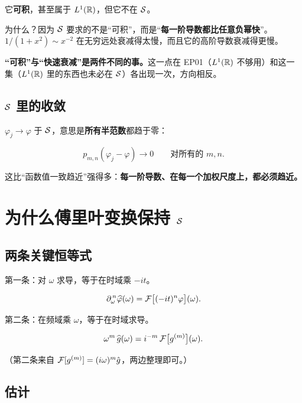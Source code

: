 \begin{warnbox}[$1/(1+x^{2})$ 是最有教育意义的一个反例]
它\textbf{可积}，甚至属于 $L^1(\mathbb{R})$，但它不在 $\mathcal{S}$。

为什么？因为 $\mathcal{S}$ 要求的不是“可积”，而是“\textbf{每一阶导数都比任意负幂快}”。$1/(1+x^{2})\sim x^{-2}$ 在无穷远处衰减得太慢，而且它的高阶导数衰减得更慢。

\textbf{“可积”与“快速衰减”是两件不同的事。}这一点在 EP01（$L^1(\mathbb{R})$ 不够用）和这一集（$L^1(\mathbb{R})$ 里的东西也未必在 $\mathcal{S}$）各出现一次，方向相反。
\end{warnbox}

\subsection{$\mathcal{S}$ 里的收敛}

$\varphi_j\to\varphi$ 于 $\mathcal{S}$，意思是\textbf{所有半范数}都趋于零：

\begin{equation}
p_{m,n}(\varphi_j-\varphi)\longrightarrow0
\qquad\text{对所有的 }m,n .
\end{equation}

这比“函数值一致趋近”强得多：\textbf{每一阶导数、在每一个加权尺度上，都必须趋近。}

\section{为什么傅里叶变换保持 $\mathcal{S}$}

\subsection{两条关键恒等式}

第一条：对 $\omega$ 求导，等于在时域乘 $-it$。

\begin{equation}
\partial_\omega^{\,n}\widehat{\varphi}(\omega)=\mathcal{F}\big[(-it)^{n}\varphi\big](\omega).\label{eq:d1}
\end{equation}

第二条：在频域乘 $\omega$，等于在时域求导。

\begin{equation}
\omega^{m}\,\widehat{g}(\omega)=i^{-m}\,\mathcal{F}\big[g^{(m)}\big](\omega).\label{eq:d2}
\end{equation}

（第二条来自 $\mathcal{F}[g^{(m)}]=(i\omega)^{m}\hat g$，两边整理即可。）

\subsection{估计}

